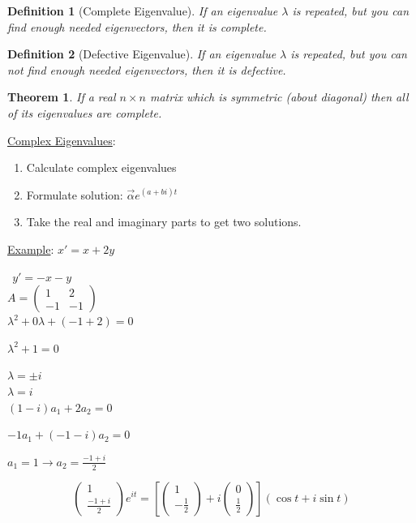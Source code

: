 \documentclass[12pt]{article}
\newtheorem{definition}{Definition}[section]
\numberwithin{equation}{subsection}
\newtheorem{theorem}{Theorem}[section]
\newcommand{\indb}{\hspace{1cm}}
\newcommand{\indc}{\hspace{1.5cm}}
\newcommand{\indd}{\hspace{2cm}}
\newcommand{\indf}{\hspace{3cm}}
\newcommand{\exa}{\noindent \underline{Example}: \hspace{1cm}}
\begin{document}
\begin{definition}[Complete Eigenvalue]
If an eigenvalue $\lambda$ is repeated, but you can find enough  needed eigenvectors, then it is complete.
\end{definition}

\begin{definition}[Defective Eigenvalue]
If an eigenvalue $\lambda$ is repeated, but you can not find enough  needed eigenvectors, then it is defective.
\end{definition}

\begin{theorem}
If a real $n \times n$ matrix which is symmetric (about diagonal) then all of its eigenvalues are complete.
\end{theorem}
\newpage

\noindent \underline{Complex Eigenvalues}:

\begin{enumerate}
\item Calculate complex eigenvalues
\item Formulate solution: $\vec{\alpha}e^{(a+bi)t}$
\item Take the real and imaginary parts to get two solutions.
\end{enumerate}

\exa $ x'=x+2y$

\indd $\ \ y'=-x-y$\\

\indb $A=\begin{pmatrix}
1 & 2 \\
-1 & -1
\end{pmatrix}$\\

\indd $\lambda^2+0\lambda + (-1+2)=0$

\indd $\lambda^2+1=0$

\indd $\lambda = \pm i$\\

\indc $\lambda= i$\\

\indb $(1-i)a_1+2a_2=0$

\indb $-1a_1+(-1-i)a_2=0$

\indf $a_1=1 \rightarrow a_2=\frac{-1+i}{2}$

$$\begin{pmatrix}
1 \\
\frac{-1+i}{2}
\end{pmatrix} e^{it} = \left[ \begin{pmatrix}
1 \\
-\frac{1}{2}
\end{pmatrix}+i\begin{pmatrix}
0 \\
\frac{1}{2}
\end{pmatrix} \right] (\cos t +i \sin t)$$
\end{document}
